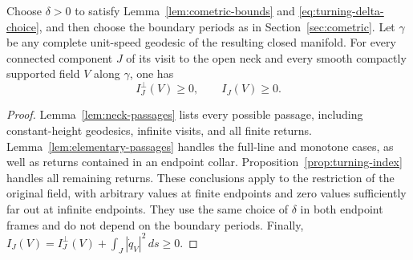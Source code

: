 \begin{proposition}\label{prop:passage-index}
Choose $\delta>0$ to satisfy Lemma~\ref{lem:cometric-bounds} and
\eqref{eq:turning-delta-choice}, and then choose the boundary periods as in
Section~\ref{sec:cometric}. Let $\gamma$ be any complete unit-speed geodesic
of the resulting closed manifold. For every connected component $J$ of
its visit to the open neck and every smooth compactly supported field
$V$ along $\gamma$, one has
\[
 I_J^\perp(V)\ge0,\qquad I_J(V)\ge0.
\]
\end{proposition}

\begin{proof}
Lemma~\ref{lem:neck-passages} lists every possible passage, including
constant-height geodesics, infinite visits, and all finite returns.
Lemma~\ref{lem:elementary-passages} handles the full-line and monotone
cases, as well as returns contained in an endpoint collar.
Proposition~\ref{prop:turning-index} handles all remaining returns.
These conclusions apply to the restriction of the original field,
with arbitrary values at finite endpoints and zero values sufficiently
far out at infinite endpoints. They use the same choice of $\delta$
in both endpoint frames and do not depend on the boundary periods.
Finally, $I_J(V)=I_J^\perp(V)+\int_J|\dot q_V|^2\,ds\ge0$.
\end{proof}
